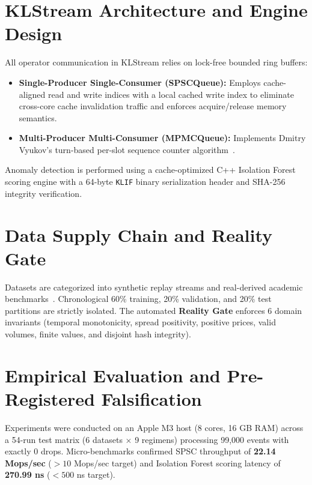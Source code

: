 \documentclass[conference,10pt]{IEEEtran}
\begin{document}
\section{KLStream Architecture and Engine Design}
All operator communication in KLStream relies on lock-free bounded ring buffers:
\begin{itemize}
    \item \textbf{Single-Producer Single-Consumer (SPSCQueue):} Employs cache-aligned read and write indices with a local cached write index to eliminate cross-core cache invalidation traffic and enforces acquire/release memory semantics.
    \item \textbf{Multi-Producer Multi-Consumer (MPMCQueue):} Implements Dmitry Vyukov's turn-based per-slot sequence counter algorithm~\cite{vyukov2014mpmc}.
\end{itemize}
Anomaly detection is performed using a cache-optimized C++ Isolation Forest~\cite{liu2008isolation} scoring engine with a 64-byte \texttt{KLIF} binary serialization header and SHA-256 integrity verification.

\section{Data Supply Chain and Reality Gate}
Datasets are categorized into synthetic replay streams and real-derived academic benchmarks~\cite{lobster2012sample}. Chronological 60\% training, 20\% validation, and 20\% test partitions are strictly isolated. The automated \textbf{Reality Gate} enforces 6 domain invariants (temporal monotonicity, spread positivity, positive prices, valid volumes, finite values, and disjoint hash integrity).

\section{Empirical Evaluation and Pre-Registered Falsification}
Experiments were conducted on an Apple M3 host (8 cores, 16 GB RAM) across a 54-run test matrix (6 datasets $\times$ 9 regimens) processing 99,000 events with exactly 0 drops. Micro-benchmarks confirmed SPSC throughput of \textbf{22.14 Mops/sec} ($>10$ Mops/sec target) and Isolation Forest scoring latency of \textbf{270.99 ns} ($<500$ ns target).
\end{document}
